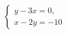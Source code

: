 \begin{ex}
	\begin{condition}
		\( \left\{
		\begin{array}{l}
			y-3x=0,\\
			x-2y=-10
		\end{array}
		\right. \)
	\end{condition}
\end{ex}
